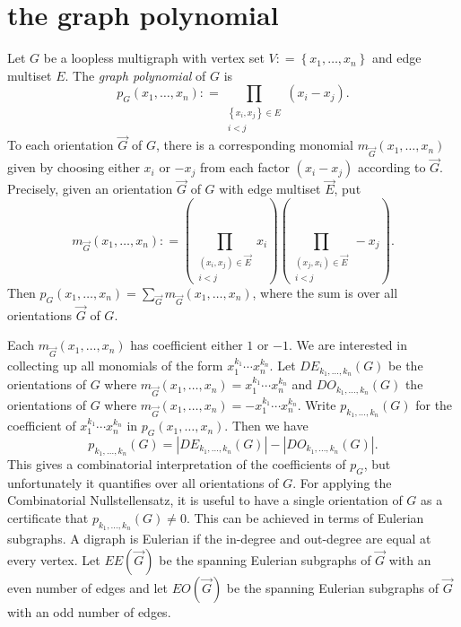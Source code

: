 \documentclass{amsbook}
\theoremstyle{plain}
\numberwithin{equation}{chapter}
\newcommand{\set}[1]{\left\{ #1 \right\}}
\newcommand{\parens}[1]{\left( #1 \right)}
\newcommand{\DefinedAs}{\mathrel{\mathop:}=}
\begin{document}
\section*{the graph polynomial}
Let $G$ be a loopless multigraph with vertex set $V \DefinedAs \set{x_1, \ldots, x_n}$ and edge multiset $E$.  The \emph{graph polynomial} of $G$ is
\[p_G(x_1,\ldots,x_n) \DefinedAs \prod_{\substack{\set{x_i,x_j} \in E\\i < j}} (x_i - x_j).\]
To each orientation $\vec{G}$ of $G$, there is a corresponding monomial $m_{\vec{G}}(x_1,\ldots, x_n)$ given by choosing either $x_i$ or $-x_j$ from each factor $(x_i - x_j)$ according to $\vec{G}$. Precisely, given an orientation $\vec{G}$ of $G$ with edge multiset $\vec{E}$, put
\[m_{\vec{G}}(x_1,\ldots, x_n) \DefinedAs \parens{\prod_{\substack{(x_i,x_j) \in \vec{E}\\i < j}} x_i}\parens{\prod_{\substack{(x_j,x_i) \in \vec{E}\\i < j}} -x_j}.\]
Then $p_G(x_1,\ldots,x_n) = \sum_{\vec{G}} m_{\vec{G}}(x_1,\ldots, x_n)$, where the sum is over all orientations $\vec{G}$ of $G$.  

Each $m_{\vec{G}}(x_1,\ldots, x_n)$ has coefficient either $1$ or $-1$.   We are interested in collecting up all monomials of the form $x_1^{k_1}\cdots x_n^{k_n}$.  Let $DE_{k_1,\ldots, k_n}(G)$ be the orientations of $G$ where $m_{\vec{G}}(x_1,\ldots, x_n) = x_1^{k_1}\cdots x_n^{k_n}$ and $DO_{k_1,\ldots, k_n}(G)$ the orientations of $G$ where $m_{\vec{G}}(x_1,\ldots, x_n) = -x_1^{k_1}\cdots x_n^{k_n}$.  Write $p_{k_1, \ldots, k_n}(G)$ for the coefficient of $x_1^{k_1}\cdots x_n^{k_n}$ in $p_G(x_1,\ldots,x_n)$.  Then we have
\[p_{k_1, \ldots, k_n}(G) = |DE_{k_1,\ldots, k_n}(G)| - |DO_{k_1,\ldots, k_n}(G)|.\]
This gives a combinatorial interpretation of the coefficients of $p_G$, but unfortunately it quantifies over all orientations of $G$.  For applying the Combinatorial Nullstellensatz, it is useful to have a single orientation of $G$ as a certificate that $p_{k_1, \ldots, k_n}(G) \ne 0$.  This can be achieved in terms of Eulerian subgraphs.  A digraph is Eulerian if the in-degree and out-degree are equal at every vertex.  Let $EE(\vec{G})$ be the spanning Eulerian subgraphs of $\vec{G}$ with an even number of edges and let $EO(\vec{G})$ be the spanning Eulerian subgraphs of $\vec{G}$ with an odd number of edges.  
\end{document}
